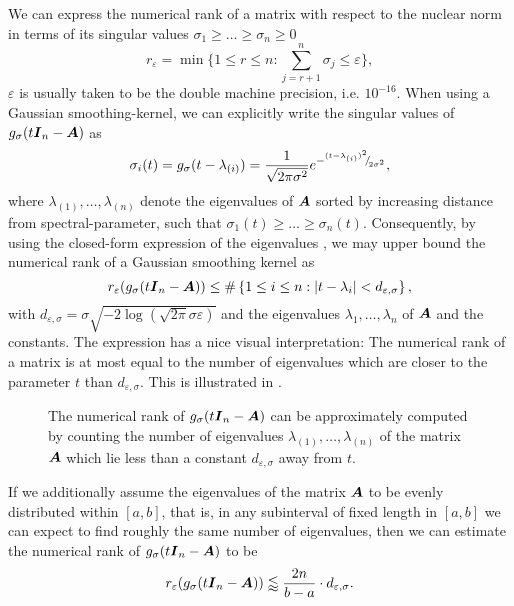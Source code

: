 \documentclass[12pt]{article}
\begin{document}
We can express the numerical rank of a matrix with respect to the nuclear norm in terms of its singular values $\sigma_1 \geq \dots \geq \sigma_n \geq 0$
\begin{equation}
    r_{\varepsilon} = \min \{1 \leq r \leq n: \sum_{j=r+1}^n \sigma_{j} \leq \varepsilon \},
    \label{equ:numerical-rank}
\end{equation}
$\varepsilon$ is usually taken to be the double machine precision, i.e. $10^{-16}$. When using a Gaussian smoothing-kernel, we can explicitly write the singular values of $g_{\sigma}(t\boldsymbol{I}_n - \boldsymbol{A})$ as
\begin{equation}
    \sigma_i(t) = g_{\sigma}(t - \lambda_{(i)}) = \frac{1}{\sqrt{2 \pi \sigma^2}} e^{-{}^{(t - \lambda_{(i)})^2}{\mskip -5mu/\mskip -3mu}_{2 \sigma^2}},
    \label{equ:gaussian-kernel-eigenvalues}
\end{equation}
where $\lambda_{(1)}, \dots, \lambda_{(n)}$ denote the eigenvalues of $\boldsymbol{A}$ sorted by increasing distance from spectral-parameter, such that $\sigma_1(t) \geq \dots \geq \sigma_n(t)$. Consequently, by using the closed-form expression of the eigenvalues , we may upper bound the numerical rank of a Gaussian smoothing kernel as
\begin{equation}
    r_{\varepsilon}(g_{\sigma}(t\boldsymbol{I}_n - \boldsymbol{A})) \leq \#\left\{1\leq i\leq n: |t - \lambda_i| < d_{\varepsilon, \sigma} \right\},
    \label{equ:gaussian-kernel-numerical-rank}
\end{equation}
with $d_{\varepsilon, \sigma} = \sigma \sqrt{-2 \log(\sqrt{2 \pi} \sigma \varepsilon)}$ and the eigenvalues $\lambda_1, \dots, \lambda_n$ of $\boldsymbol{A}$ and the constants. The expression  has a nice visual interpretation: The numerical rank of a matrix is at most equal to the number of eigenvalues which are closer to the parameter $t$ than $d_{\varepsilon, \sigma}$. This is illustrated in .
\begin{figure}[ht]
    \centering
    
    \caption{The numerical rank of $g_{\sigma}(t\boldsymbol{I}_n - \boldsymbol{A})$ can be
        approximately computed by counting the number of eigenvalues
        $\lambda_{(1)}, \dots, \lambda_{(n)}$ of the matrix $\boldsymbol{A}$ which lie less than
        a constant $d_{\varepsilon, \sigma}$ away from $t$.}
    \label{fig:numerical-rank}
\end{figure}

If we additionally assume the eigenvalues of the matrix $\boldsymbol{A}$ to be evenly distributed within $[a, b]$, that is, in any subinterval of fixed length in $[a, b]$ we can expect to find roughly the same number of eigenvalues, then we can estimate the numerical rank of $g_{\sigma}(t\boldsymbol{I}_n - \boldsymbol{A})$ to be
\begin{equation}
    r_{\varepsilon}(g_{\sigma}(t\boldsymbol{I}_n - \boldsymbol{A})) \lessapprox \frac{2 n}{b - a} \cdot d_{\varepsilon, \sigma}.
    \label{equ:gaussian-kernel-numerical-rank-uniform}
\end{equation}
\end{document}
